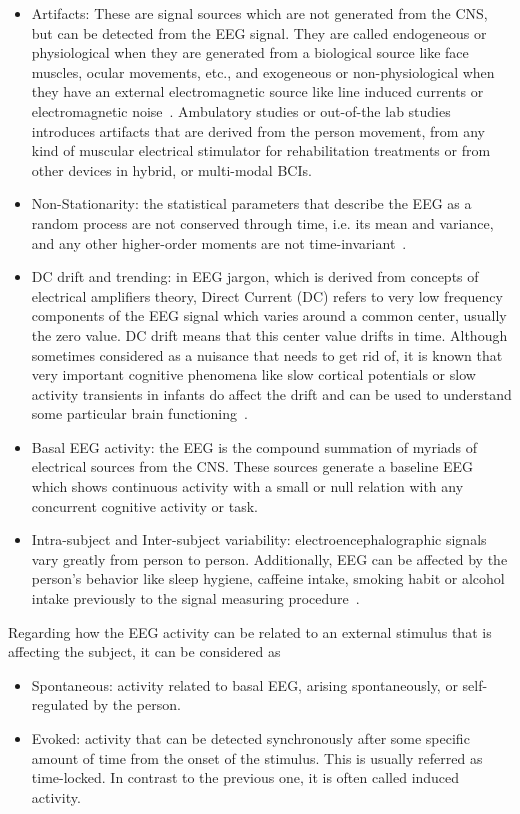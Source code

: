 \begin{itemize}
\item Artifacts:  These are signal sources which are not generated from the CNS, but can be detected from the EEG signal.  They are called endogeneous or physiological when they are generated from a biological source like face muscles, ocular movements, etc., and exogeneous or non-physiological when they have an external electromagnetic source like line induced currents or electromagnetic noise~\cite{Weeda2012}.  Ambulatory studies or out-of-the lab studies introduces artifacts that are derived from the person movement, from any kind of muscular electrical stimulator for rehabilitation treatments or from other devices in hybrid, or multi-modal BCIs.
\item Non-Stationarity: the statistical parameters that describe the EEG as a random process are not conserved through time, i.e. its mean and variance, and any other higher-order moments are not time-invariant~\cite{Jansen1991}.
\item DC drift and trending: in EEG jargon, which is derived from concepts of electrical amplifiers theory, Direct Current (DC) refers to very low frequency components of the EEG signal which varies around a common center, usually the zero value.  DC drift means that this center value drifts in time.  Although sometimes considered as a nuisance that needs to get rid of, it is known that very important cognitive phenomena like slow cortical potentials or slow activity transients in infants do affect the drift and can be used to understand some particular brain functioning~\cite{Vanhatalo2005,Schomer2010}.
\item Basal EEG activity: the EEG is the compound summation of myriads of electrical sources from the CNS.  These sources generate a baseline EEG which shows continuous activity with a small or null relation with any concurrent cognitive activity or task.
\item Intra-subject and Inter-subject variability: electroencephalographic signals vary greatly from person to person.  Additionally, EEG can be affected by the person's behavior like sleep hygiene, caffeine intake, smoking habit or alcohol intake previously to the signal measuring procedure~\cite{Farzan2017}.
\end{itemize}

Regarding how the EEG activity can be related to an external stimulus that is affecting the subject, it can be considered as

\begin{itemize}
\item Spontaneous: activity related to basal EEG, arising spontaneously, or self-regulated by the person.
\item Evoked: activity that can be detected synchronously after some specific amount of time from the onset of the stimulus.  This is usually referred as time-locked.  In contrast to the previous one, it is often called induced activity.
\end{itemize}

